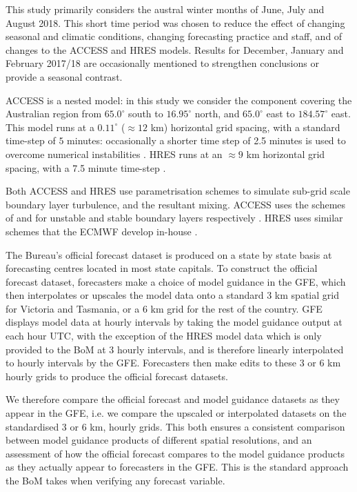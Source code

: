\documentclass{ametsoc}
\begin{document}
This study primarily considers the austral winter months of June, July and August 2018. This short time period was chosen to reduce the effect of changing seasonal and climatic conditions, changing forecasting practice and staff, and of changes to the ACCESS and HRES models. Results for December, January and February 2017/18 are occasionally mentioned to strengthen conclusions or provide a seasonal contrast. 

ACCESS is a nested model: in this study we consider the component covering the Australian region from $65.0^\circ$ south to $16.95^\circ$ north, and $65.0^\circ$ east to $184.57^\circ$ east. This model runs at a $0.11^\circ$ ($\approx 12$ km) horizontal grid spacing, with a standard time-step of $5$ minutes: occasionally a shorter time step of 2.5 minutes is used to overcome numerical instabilities \citep{bom16}. HRES runs at an $\approx 9$ km horizontal grid spacing, with a 7.5 minute time-step \citep{ecmwf19c}. 

Both ACCESS and HRES use parametrisation schemes to simulate sub-grid scale boundary layer turbulence, and the resultant mixing. ACCESS uses the schemes of \citet{lock00} and \citet{louis79} for unstable and stable boundary layers respectively \citep{bom10}. HRES uses similar schemes that the ECMWF develop in-house \citep{ecmwf19a}.

The Bureau's official forecast dataset is produced on a state by state basis at forecasting centres located in most state capitals. To construct the official forecast dataset, forecasters make a choice of model guidance in the GFE, which then interpolates or upscales the model data onto a standard 3 km spatial grid for Victoria and Tasmania, or a 6 km grid for the rest of the country. GFE displays model data at hourly intervals by taking the model guidance output at each hour UTC, with the exception of the HRES model data which is only provided to the BoM at 3 hourly intervals, and is therefore linearly interpolated to hourly intervals by the GFE. Forecasters then make edits to these 3 or 6 km hourly grids to produce the official forecast datasets. 

We therefore compare the official forecast and model guidance datasets as they appear in the GFE, i.e. we compare the upscaled or interpolated datasets on the standardised 3 or 6 km, hourly grids. This both ensures a consistent comparison between model guidance products of different spatial resolutions, and an assessment of how the official forecast compares to the model guidance products as they actually appear to forecasters in the GFE. This is the standard approach the BoM takes when verifying any forecast variable.
\end{document}
